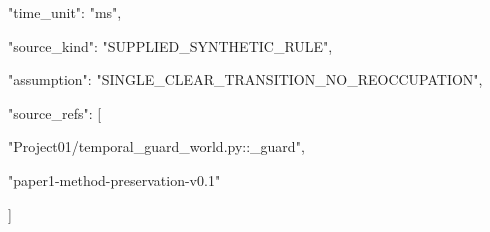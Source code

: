 \documentclass[11pt,a4paper]{article}
\begin{document}
\begin{minipage}{\linewidth}
{\begin{minipage}{\dimexpr\linewidth-2\fboxsep-2\fboxrule\relax}
\noindent{}\hspace{.8em}\parbox[t]{\dimexpr\linewidth-2.8em\relax}{\raggedright\ttfamily\fontsize{8.2}{10.5}\selectfont \hspace*{1.0em}"time\_unit": "ms",\strut}\par\vspace{1pt}
\noindent{}\hspace{.8em}\parbox[t]{\dimexpr\linewidth-2.8em\relax}{\raggedright\ttfamily\fontsize{8.2}{10.5}\selectfont \hspace*{1.0em}"source\_kind": "SUPPLIED\_SYNTHETIC\_RULE",\strut}\par\vspace{1pt}
\noindent{}\hspace{.8em}\parbox[t]{\dimexpr\linewidth-2.8em\relax}{\raggedright\ttfamily\fontsize{8.2}{10.5}\selectfont \hspace*{1.0em}"assumption": "SINGLE\_CLEAR\_TRANSITION\_NO\_REOCCUPATION",\strut}\par\vspace{1pt}
\noindent{}\hspace{.8em}\parbox[t]{\dimexpr\linewidth-2.8em\relax}{\raggedright\ttfamily\fontsize{8.2}{10.5}\selectfont \hspace*{1.0em}"source\_refs": [\strut}\par\vspace{1pt}
\noindent{}\hspace{.8em}\parbox[t]{\dimexpr\linewidth-2.8em\relax}{\raggedright\ttfamily\fontsize{8.2}{10.5}\selectfont \hspace*{2.0em}"Project01/temporal\_guard\_world.py::\_guard",\strut}\par\vspace{1pt}
\noindent{}\hspace{.8em}\parbox[t]{\dimexpr\linewidth-2.8em\relax}{\raggedright\ttfamily\fontsize{8.2}{10.5}\selectfont \hspace*{2.0em}"paper1-method-preservation-v0.1"\strut}\par\vspace{1pt}
\noindent{}\hspace{.8em}\parbox[t]{\dimexpr\linewidth-2.8em\relax}{\raggedright\ttfamily\fontsize{8.2}{10.5}\selectfont \hspace*{1.0em}]\strut}\par\vspace{1pt}

\end{minipage}}
\end{minipage}
\end{document}
